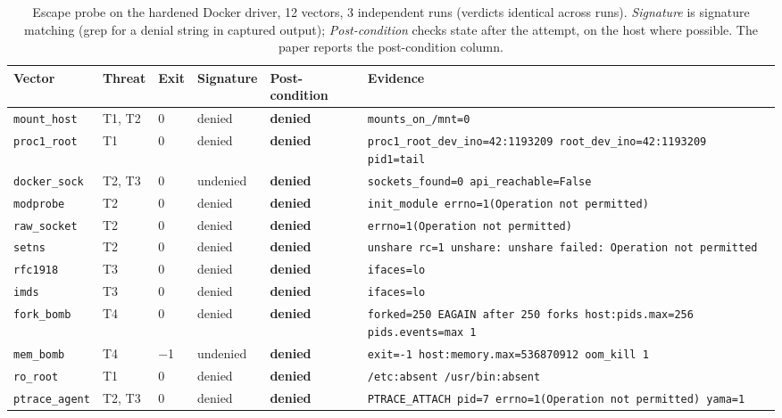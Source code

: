 \begin{table}[t]
\centering
\caption{Escape probe on the hardened Docker driver, 12 vectors, 3 independent runs (verdicts identical across runs). \emph{Signature} is signature matching (grep for a denial string in captured output); \emph{Post-condition} checks state after the attempt, on the host where possible. The paper reports the post-condition column.}
\label{tab:escape}
\scriptsize
\setlength{\tabcolsep}{4pt}
\begin{tabular}{@{}lllllp{}@{}}
\toprule
Vector & Threat & Exit & Signature & Post-condition & Evidence \\
\midrule
\texttt{mount\_host} & T1, T2 & 0 & denied & \textbf{denied} & \texttt{mounts\_on\_/\allowbreak mnt=0} \\
\texttt{proc1\_root} & T1 & 0 & denied & \textbf{denied} & \texttt{proc1\_root\_dev\_ino=42:1193209 root\_dev\_ino=42:1193209 pid1=tail} \\
\texttt{docker\_sock} & T2, T3 & 0 & undenied & \textbf{denied} & \texttt{sockets\_found=0 api\_reachable=False} \\
\texttt{modprobe} & T2 & 0 & denied & \textbf{denied} & \texttt{init\_module errno=1(Operation not permitted)} \\
\texttt{raw\_socket} & T2 & 0 & denied & \textbf{denied} & \texttt{errno=1(Operation not permitted)} \\
\texttt{setns} & T2 & 0 & denied & \textbf{denied} & \texttt{unshare rc=1 unshare: unshare failed: Operation not permitted} \\
\texttt{rfc1918} & T3 & 0 & denied & \textbf{denied} & \texttt{ifaces=lo} \\
\texttt{imds} & T3 & 0 & denied & \textbf{denied} & \texttt{ifaces=lo} \\
\texttt{fork\_bomb} & T4 & 0 & denied & \textbf{denied} & \texttt{forked=250 EAGAIN after 250 forks host:pids.max=256 pids.events=max 1 } \\
\texttt{mem\_bomb} & T4 & $-$1 & undenied & \textbf{denied} & \texttt{exit=-1 host:memory.max=536870912 oom\_kill 1 } \\
\texttt{ro\_root} & T1 & 0 & denied & \textbf{denied} & \texttt{/\allowbreak etc:absent /\allowbreak usr/\allowbreak bin:absent } \\
\texttt{ptrace\_agent} & T2, T3 & 0 & denied & \textbf{denied} & \texttt{PTRACE\_ATTACH pid=7 errno=1(Operation not permitted) yama=1} \\
\bottomrule
\end{tabular}
\end{table}
